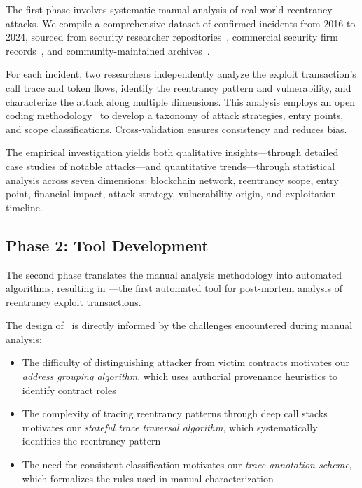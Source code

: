 The first phase involves systematic manual analysis of real-world reentrancy attacks. We compile a comprehensive dataset of  confirmed incidents from 2016 to 2024, sourced from security researcher repositories~\cite{reentrancy-list-pcaversaccio}, commercial security firm records~\cite{blocksec-security-incidents}, and community-maintained archives~\cite{slowmist-hacked}.

For each incident, two researchers independently analyze the exploit transaction's call trace and token flows, identify the reentrancy pattern and vulnerability, and characterize the attack along multiple dimensions. This analysis employs an open coding methodology~\cite{open-coding:strauss-corbin, open-coding:saldana} to develop a taxonomy of attack strategies, entry points, and scope classifications.
Cross-validation ensures consistency and reduces bias.

The empirical investigation yields both qualitative insights---through detailed case studies of notable attacks---and quantitative trends---through statistical analysis across seven dimensions: blockchain network, reentrancy scope, entry point, financial impact, attack strategy, vulnerability origin, and exploitation timeline.

\subsection{Phase 2: Tool Development}

The second phase translates the manual analysis methodology into automated algorithms, resulting in \ToolName---the first automated tool for post-mortem analysis of reentrancy exploit transactions.

The design of \ToolName\ is directly informed by the challenges encountered during manual analysis:
\begin{itemize}
    \item The difficulty of distinguishing attacker from victim contracts motivates our \textit{address grouping algorithm}, which uses authorial provenance heuristics to identify contract roles
    \item The complexity of tracing reentrancy patterns through deep call stacks motivates our \textit{stateful trace traversal algorithm}, which systematically identifies the reentrancy pattern
    \item The need for consistent classification motivates our \textit{trace annotation scheme}, which formalizes the rules used in manual characterization
\end{itemize}

